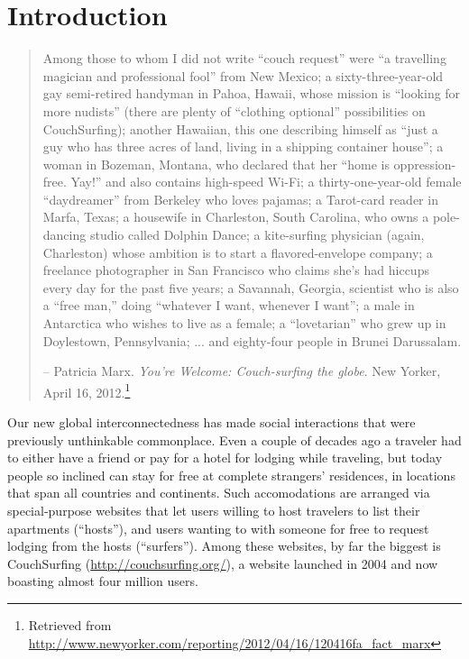 \section{Introduction} \label{sec:introduction}

\begin{quotation}
Among those to whom I did not write ``couch request'' were ``a travelling magician and professional fool'' from New Mexico; a sixty-three-year-old gay semi-retired handyman in Pahoa, Hawaii, whose mission is ``looking for more nudists'' (there are plenty of ``clothing optional'' possibilities on CouchSurfing); another Hawaiian, this one describing himself as ``just a guy who has three acres of land, living in a shipping container house''; a woman in Bozeman, Montana, who declared that her ``home is oppression-free. Yay!'' and also contains high-speed Wi-Fi; a thirty-one-year-old female ``daydreamer'' from Berkeley who loves pajamas; a Tarot-card reader in Marfa, Texas; a housewife in Charleston, South Carolina, who owns a pole-dancing studio called Dolphin Dance; a kite-surfing physician (again, Charleston) whose ambition is to start a flavored-envelope company; a freelance photographer in San Francisco who claims she’s had hiccups every day for the past five years; a Savannah, Georgia, scientist who is also a ``free man,'' doing ``whatever I want, whenever I want''; a male in Antarctica who wishes to live as a female; a ``lovetarian'' who grew up in Doylestown, Pennsylvania; ... and eighty-four people in Brunei Darussalam.

-- Patricia Marx. \emph{You're Welcome: Couch-surfing the globe}. New Yorker, April 16, 2012.\footnote{Retrieved from \url{http://www.newyorker.com/reporting/2012/04/16/120416fa_fact_marx}}
\end{quotation}

Our new global interconnectedness has made social interactions that were previously unthinkable commonplace.
Even a couple of decades ago a traveler had to either have a friend or pay for a hotel for lodging while traveling, but today people so inclined can stay for free at complete strangers' residences, in locations that span all countries and continents.
Such accomodations are arranged via special-purpose websites that let users willing to host travelers to list their apartments (``hosts''), and users wanting to with someone for free to request lodging from the hosts (``surfers'').
Among these websites, by far the biggest is CouchSurfing (\url{http://couchsurfing.org/}), a website launched in 2004 and now boasting almost four million users.

